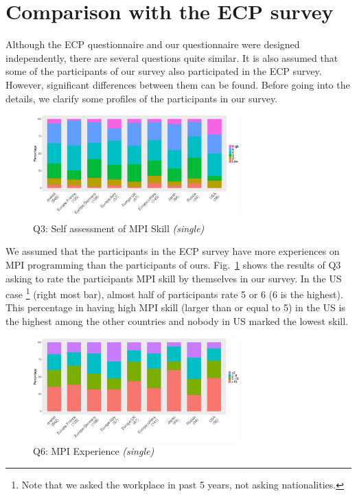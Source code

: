 \documentclass[conference,10pt,letterpaper]{IEEEtran}
\begin{document}
\section{Comparison with the ECP survey}

Although the ECP questionnaire and our questionnaire were designed
independently, there are several questions quite similar. It is also
assumed that some of the participants of our survey 
also participated in the ECP survey. However, significant differences
between them can be found. Before going into the details, we clarify
some profiles of the participants in our survey.

\begin{figure}[htb]
\begin{center}
\includegraphics[width=8cm]{R-scripts/Q3.pdf}
\caption{Q3: Self assessment of MPI Skill {\it(single)}}
\label{fig:mpi-skill}
\end{center}
\end{figure}

We assumed that the participants in the ECP survey have more
experiences on MPI
programming than the participants of ours. Fig.~\ref{fig:mpi-skill} 
shows the results of Q3 asking to rate the participants MPI skill by
themselves in our survey.  In the US case 
\footnote{Note that we asked
  the workplace in past 5 years, not asking nationalities.}
(right most bar), almost half of participants rate 5 or 6
(6 is the highest). This percentage in having high MPI skill (larger
than or equal to 5) in the US is the highest among the other
countries and nobody in US marked the lowest skill.

\begin{figure}[htb]
\begin{center}
\includegraphics[width=8cm]{R-scripts/Q6.pdf}
\caption{Q6: MPI Experience {\it(single)}}
\label{fig:mpi-experience}
\end{center}
\end{figure}
\end{document}

